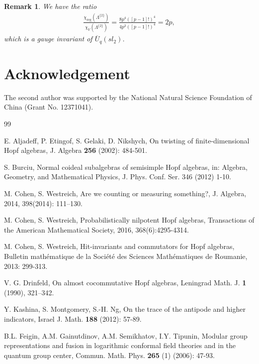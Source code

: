 \documentclass[11pt]{amsart}
\newtheorem{rem}[thm]{Remark}
\numberwithin{equation}{section}
\begin{document}
\begin{rem}We have the ratio
\begin{align*}
\frac{\chi_{\operatorname{reg}}(\Lambda^{\{2\}})}{\chi_{V}(\Lambda^{\{2\}})}=\frac{8p^4([p-1]!)^4}{4p^3([p-1]!)^4}=2p,
\end{align*}
which is a gauge invariant of $\overline{U}_q(sl_2)$.
\end{rem}


\section*{Acknowledgement}
The second author was supported by the National Natural Science Foundation of China (Grant No. 12371041).

 \vskip5pt
\begin{thebibliography}{99}

E. Aljadeff, P. Etingof, S. Gelaki, D. Nikshych, On twisting of finite-dimensional Hopf algebras, J. Algebra {\bf 256} (2002): 484-501.


S. Burciu, Normal coideal subalgebras of semisimple Hopf algebras, in: Algebra, Geometry, and Mathematical Physics, J. Phys. Conf. Ser. 346 (2012) 1-10.

M. Cohen, S. Westreich, Are we counting or measuring something?, J. Algebra, 2014, 398(2014): 111–130.

M. Cohen, S. Westreich, Probabilistically nilpotent Hopf algebras, Transactions of the American Mathematical Society, 2016, 368(6):4295-4314.

M. Cohen, S. Westreich, Hit-invariants and commutators for Hopf algebras, Bulletin mathématique de la Société des Sciences Mathématiques de Roumanie, 2013: 299-313.

V. G. Drinfeld, On almost cocommutative Hopf algebras, Leningrad Math. J. \textbf{1} (1990), 321–342.


Y. Kashina, S. Montgomery, S.-H. Ng, On the trace of the antipode and higher indicators, Israel J. Math. {\bf188} (2012): 57-89.

B.L. Feigin, A.M. Gainutdinov, A.M. Semikhatov, I.Y. Tipunin, Modular group representations and fusion in logarithmic conformal field theories and in the quantum group
center, Commun. Math. Phys. {\bf265} (1) (2006): 47-93.


\end{thebibliography}
\end{document}
